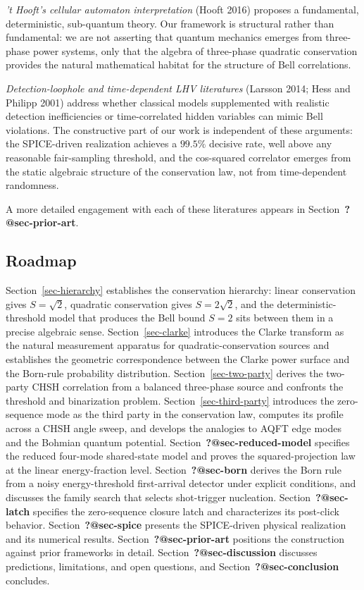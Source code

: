 \documentclass[
  11pt]{article}
\begin{document}
\emph{'t Hooft's cellular automaton interpretation} (Hooft 2016)
proposes a fundamental, deterministic, sub-quantum theory. Our framework
is structural rather than fundamental: we are not asserting that quantum
mechanics emerges from three-phase power systems, only that the algebra
of three-phase quadratic conservation provides the natural mathematical
habitat for the structure of Bell correlations.

\emph{Detection-loophole and time-dependent LHV literatures} (Larsson
2014; Hess and Philipp 2001) address whether classical models
supplemented with realistic detection inefficiencies or time-correlated
hidden variables can mimic Bell violations. The constructive part of our
work is independent of these arguments: the SPICE-driven realization
achieves a \(99.5\%\) decisive rate, well above any reasonable
fair-sampling threshold, and the cos-squared correlator emerges from the
static algebraic structure of the conservation law, not from
time-dependent randomness.

A more detailed engagement with each of these literatures appears in
Section~\textbf{?@sec-prior-art}.

\subsection{Roadmap}\label{roadmap}

Section~\ref{sec-hierarchy} establishes the conservation hierarchy:
linear conservation gives \(S = \sqrt{2}\), quadratic conservation gives
\(S = 2\sqrt{2}\), and the deterministic-threshold model that produces
the Bell bound \(S = 2\) sits between them in a precise algebraic sense.
Section~\ref{sec-clarke} introduces the Clarke transform as the natural
measurement apparatus for quadratic-conservation sources and establishes
the geometric correspondence between the Clarke power surface and the
Born-rule probability distribution. Section~\ref{sec-two-party} derives
the two-party CHSH correlation from a balanced three-phase source and
confronts the threshold and binarization problem.
Section~\ref{sec-third-party} introduces the zero-sequence mode as the
third party in the conservation law, computes its profile across a CHSH
angle sweep, and develops the analogies to AQFT edge modes and the
Bohmian quantum potential. Section~\textbf{?@sec-reduced-model}
specifies the reduced four-mode shared-state model and proves the
squared-projection law at the linear energy-fraction level.
Section~\textbf{?@sec-born} derives the Born rule from a noisy
energy-threshold first-arrival detector under explicit conditions, and
discusses the family search that selects shot-trigger nucleation.
Section~\textbf{?@sec-latch} specifies the zero-sequence closure latch
and characterizes its post-click behavior. Section~\textbf{?@sec-spice}
presents the SPICE-driven physical realization and its numerical
results. Section~\textbf{?@sec-prior-art} positions the construction
against prior frameworks in detail. Section~\textbf{?@sec-discussion}
discusses predictions, limitations, and open questions, and
Section~\textbf{?@sec-conclusion} concludes.
\end{document}
